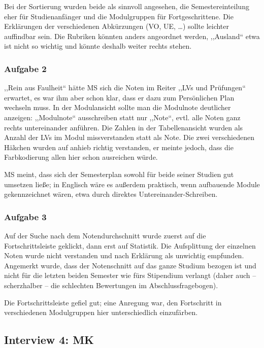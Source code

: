 \documentclass[a4paper,10pt]{scrartcl}
\begin{document}
Bei der Sortierung wurden beide als sinnvoll angesehen, die Semestereinteilung eher für Studienanfänger und die Modulgruppen für Fortgeschrittene. Die Erklärungen der verschiedenen Abkürzungen (VO, UE, …) sollte leichter auffindbar sein. Die Rubriken könnten anders angeordnet werden, ,,Ausland`` etwa ist nicht so wichtig und könnte deshalb weiter rechts stehen.

\subsubsection*{Aufgabe 2}

,,Rein aus Faulheit`` hätte MS sich die Noten im Reiter ,,LVs und Prüfungen`` erwartet, es war ihm aber schon klar, dass er dazu zum Persönlichen Plan wechseln muss. In der Modulansicht sollte man die Modulnote deutlicher anzeigen: ,,Modulnote`` ausschreiben statt nur ,,Note``, evtl. alle Noten ganz rechts untereinander anführen. Die Zahlen in der Tabellenansicht wurden als Anzahl der LVs im Modul missverstanden statt als Note. Die zwei verschiedenen Häkchen wurden auf anhieb richtig verstanden, er meinte jedoch, dass die Farbkodierung allen hier schon ausreichen würde.

MS meint, dass sich der Semesterplan sowohl für beide seiner Studien gut umsetzen ließe; in Englisch wäre es außerdem praktisch, wenn aufbauende Module gekennzeichnet wären, etwa durch direktes Untereinander-Schreiben.

\subsubsection*{Aufgabe 3}

Auf der Suche nach dem Notendurchschnitt wurde zuerst auf die Fortschrittsleiste geklickt, dann erst auf Statistik. Die Aufsplittung der einzelnen Noten wurde nicht verstanden und nach Erklärung als unwichtig empfunden. Angemerkt wurde, dass der Notenschnitt auf das ganze Studium bezogen ist und nicht für die letzten beiden Semester wie fürs Stipendium verlangt (daher auch -- scherzhalber -- die schlechten Bewertungen im Abschlussfragebogen).

Die Fortschrittsleiste gefiel gut; eine Anregung war, den Fortschritt in verschiedenen Modulgruppen hier unterschiedlich einzufärben.

\subsection*{Interview 4: MK}
\end{document}
